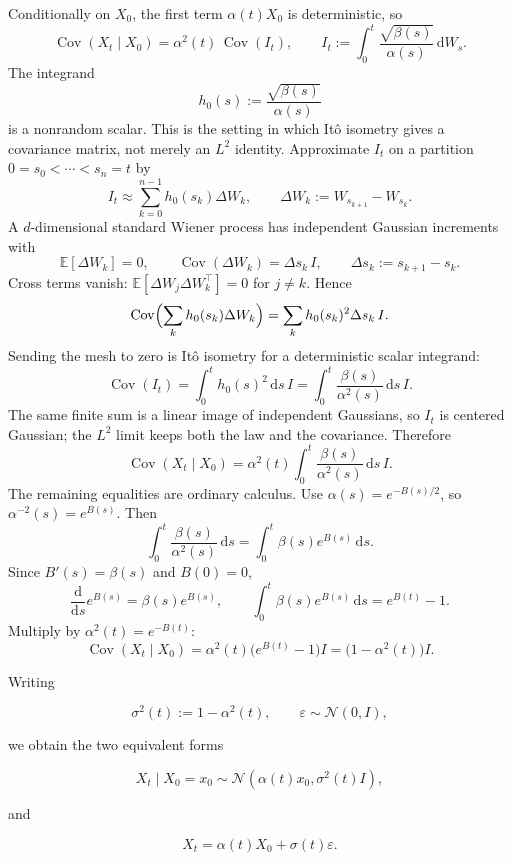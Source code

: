 \documentclass[11pt,a4paper]{article}
\theoremstyle{definition}
\begin{document}
Conditionally on $X_0$, the first term $\alpha(t)X_0$ is deterministic, so
\[
\operatorname{Cov}(X_t\mid X_0)
=
\alpha^2(t)\,
\operatorname{Cov}(I_t),
\qquad
I_t
:=
\int_0^t
\frac{\sqrt{\beta(s)}}{\alpha(s)}\,\mathrm{d}W_s.
\]
The integrand
\[
h_0(s)
:=
\frac{\sqrt{\beta(s)}}{\alpha(s)}
\]
is a nonrandom scalar. This is the setting in which It\^o isometry gives a covariance
matrix, not merely an $L^2$ identity. Approximate $I_t$ on a partition
$0=s_0<\cdots<s_n=t$ by
\[
I_t
\approx
\sum_{k=0}^{n-1}h_0(s_k)\Delta W_k,
\qquad
\Delta W_k:=W_{s_{k+1}}-W_{s_k}.
\]
A $d$-dimensional standard Wiener process has independent Gaussian increments with
\[
\mathbb{E}[\Delta W_k]=0,
\qquad
\operatorname{Cov}(\Delta W_k)=\Delta s_k\,I,
\qquad
\Delta s_k:=s_{k+1}-s_k.
\]
Cross terms vanish: $\mathbb{E}[\Delta W_j\Delta W_k^\top]=0$ for $j\neq k$. Hence
\[
\operatorname{Cov}\Bigl(\sum_k h_0(s_k)\Delta W_k\Bigr)
=
\sum_k h_0(s_k)^2\Delta s_k\,I.
\]
Sending the mesh to zero is It\^o isometry for a deterministic scalar integrand:
\[
\operatorname{Cov}(I_t)
=
\int_0^t h_0(s)^2\,\mathrm{d}s\,I
=
\int_0^t\frac{\beta(s)}{\alpha^2(s)}\,\mathrm{d}s\,I.
\]
The same finite sum is a linear image of independent Gaussians, so $I_t$ is centered
Gaussian; the $L^2$ limit keeps both the law and the covariance. Therefore
\[
\operatorname{Cov}(X_t\mid X_0)
=
\alpha^2(t)\int_0^t\frac{\beta(s)}{\alpha^2(s)}\,\mathrm{d}s\,I.
\]
The remaining equalities are ordinary calculus. Use $\alpha(s)=e^{-B(s)/2}$, so
$\alpha^{-2}(s)=e^{B(s)}$. Then
\[
\int_0^t\frac{\beta(s)}{\alpha^2(s)}\,\mathrm{d}s
=
\int_0^t\beta(s)e^{B(s)}\,\mathrm{d}s.
\]
Since $B'(s)=\beta(s)$ and $B(0)=0$,
\[
\frac{\mathrm{d}}{\mathrm{d}s}e^{B(s)}=\beta(s)e^{B(s)},
\qquad
\int_0^t\beta(s)e^{B(s)}\,\mathrm{d}s
=
e^{B(t)}-1.
\]
Multiply by $\alpha^2(t)=e^{-B(t)}$:
\[
\operatorname{Cov}(X_t\mid X_0)
=
\alpha^2(t)\bigl(e^{B(t)}-1\bigr)I
=
\bigl(1-\alpha^2(t)\bigr)I.
\]

Writing

\[
\sigma^2(t):=1-\alpha^2(t),
\qquad
\varepsilon\sim\mathcal{N}(0,I),
\]

we obtain the two equivalent forms

\[
X_t\mid X_0=x_0
\sim
\mathcal{N}\left(\alpha(t)x_0,\sigma^2(t)I\right),
\]

and

\[
X_t=\alpha(t)X_0+\sigma(t)\varepsilon.
\]
\end{document}
